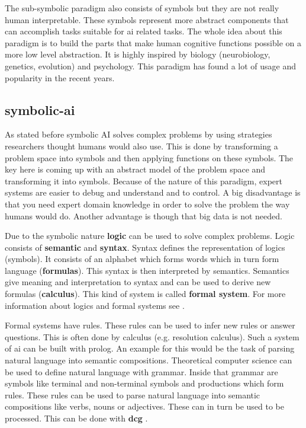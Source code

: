 \documentclass[jou,apacite]{apa6}
\begin{document}
The sub-symbolic paradigm also consists of symbols but they are not really human interpretable. These symbols represent more abstract components that can accomplish tasks suitable for \gls{ai} related tasks. The whole idea about this paradigm is to build the parts that make human cognitive functions possible on a more low level abstraction. It is highly inspired by biology (neurobiology, genetics, evolution) and psychology. This paradigm has found a lot of usage and popularity in the recent years.

\subsection{\gls{symbolic-ai}}
As stated before symbolic AI solves complex problems by using strategies researchers thought humans would also use. This is done by transforming a problem space into symbols and then applying functions on these symbols. The key here is coming up with an abstract model of the problem space and transforming it into symbols. Because of the nature of this paradigm, expert systems are easier to debug and understand and to control. A big disadvantage is that you need expert domain knowledge in order to solve the problem the way humans would do. Another advantage is though that big data is not needed.

Due to the symbolic nature \textbf{logic} can be used to solve complex problems. Logic consists of \textbf{semantic} and \textbf{syntax}. Syntax defines the representation of logics (symbols). It consists of an alphabet which forms words which in turn form language (\textbf{formulas}). This syntax is then interpreted by semantics. Semantics give meaning and interpretation to syntax and can be used to derive new formulas (\textbf{calculus}). This kind of system is called \textbf{formal system}. For more information about logics and formal systems see \cite{Richardson2006}. 

Formal systems have rules. These rules can be used to infer new rules or answer questions. This is often done by calculus (e.g. resolution calculus). Such a system of \gls{ai} can be built with \gls{prolog}. An example for this would be the task of parsing natural language into semantic compositions. Theoretical computer science can be used to define natural language with grammar. Inside that grammar are symbols like terminal and non-terminal symbols and productions which form rules. These rules can be used to parse natural language into semantic compositions like verbs, nouns or adjectives. These can in turn be used to be processed. This can be done with \textbf{\gls{dcg}} \cite{Wood1990}.
\end{document}
